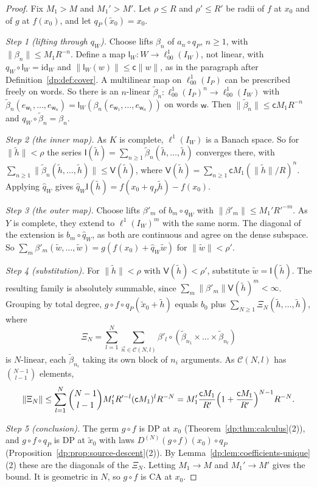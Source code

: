 \documentclass[11pt]{amsart}
\theoremstyle{definition}
\theoremstyle{remark}
\numberwithin{equation}{section}
\newcommand{\id}{\mathrm{id}}
\newcommand{\norm}[1]{\lVert #1\rVert}
\theoremstyle{plain}
\theoremstyle{definition}
\theoremstyle{plain}
\begin{document}
\begin{proof}
Fix $M_1>M$ and $M_1'>M'$. Let $\rho\le R$ and $\rho'\le R'$ be radii of $f$ at $x_0$ and of $g$ at $f(x_0)$, and let $q_P(\tilde x_0)=x_0$.

\emph{Step 1 (lifting through $q_W$).} Choose lifts $\beta_n$ of $a_n\circ q_P$, $n\ge1$, with $\norm{\beta_n}\le M_1R^{-n}$. Define a map $\mathsf l_W\colon W\to\ell^1_{00}(I_W)$, not linear, with $q_W\circ\mathsf l_W=\id_W$ and $\norm{\mathsf l_W(w)}\le\mathsf c\norm w$, as in the paragraph after Definition~\ref{dp:def:cover}. A multilinear map on $\ell^1_{00}(I_P)$ can be prescribed freely on words. So there is an $n$-linear $\tilde\beta_n\colon\ell^1_{00}(I_P)^n\to\ell^1_{00}(I_W)$ with $\tilde\beta_n(e_{\mathsf w_1},\dots,e_{\mathsf w_n})=\mathsf l_W(\beta_n(e_{\mathsf w_1},\dots,e_{\mathsf w_n}))$ on words $\mathsf w$. Then $\norm{\tilde\beta_n}\le\mathsf cM_1R^{-n}$ and $q_W\circ\tilde\beta_n=\beta_n$.

\emph{Step 2 (the inner map).} As $K$ is complete, $\ell^1(I_W)$ is a Banach space. So for $\norm{\tilde h}<\rho$ the series $\mathsf I(\tilde h)=\sum_{n\ge1}\tilde\beta_n(\tilde h,\dots,\tilde h)$ converges there, with $\sum_{n\ge1}\norm{\tilde\beta_n(\tilde h,\dots,\tilde h)}\le\mathsf V(\tilde h)$, where $\mathsf V(\tilde h)=\sum_{n\ge1}\mathsf cM_1(\norm{\tilde h}/R)^n$. Applying $\hat q_W$ gives $\hat q_W\mathsf I(\tilde h)=f(x_0+q_P\tilde h)-f(x_0)$.

\emph{Step 3 (the outer map).} Choose lifts $\beta'_m$ of $b_m\circ q_W$ with $\norm{\beta'_m}\le M_1'R'^{-m}$. As $Y$ is complete, they extend to $\ell^1(I_W)^m$ with the same norm. The diagonal of the extension is $b_m\circ\hat q_W$, as both are continuous and agree on the dense subspace. So $\sum_m\beta'_m(\tilde w,\dots,\tilde w)=g(f(x_0)+\hat q_W\tilde w)$ for $\norm{\tilde w}<\rho'$.

\emph{Step 4 (substitution).} For $\norm{\tilde h}<\rho$ with $\mathsf V(\tilde h)<\rho'$, substitute $\tilde w=\mathsf I(\tilde h)$. The resulting family is absolutely summable, since $\sum_m\norm{\beta'_m}\mathsf V(\tilde h)^m<\infty$. Grouping by total degree, $g\circ f\circ q_P(\tilde x_0+\tilde h)$ equals $b_0$ plus $\sum_{N\ge1}\Xi_N(\tilde h,\dots,\tilde h)$, where
\[
 \Xi_N=\sum_{l=1}^N\sum_{\vec n\in\mathcal C(N,l)}\beta'_l\circ(\tilde\beta_{n_1}\times\dots\times\tilde\beta_{n_l})
\]
is $N$-linear, each $\tilde\beta_{n_i}$ taking its own block of $n_i$ arguments. As $\mathcal C(N,l)$ has $\binom{N-1}{l-1}$ elements,
\[
 \norm{\Xi_N}\le\sum_{l=1}^N\binom{N-1}{l-1}M_1'R'^{-l}(\mathsf cM_1)^lR^{-N}=M_1'\frac{\mathsf cM_1}{R'}\Bigl(1+\frac{\mathsf cM_1}{R'}\Bigr)^{N-1}R^{-N}.
\]

\emph{Step 5 (conclusion).} The germ $g\circ f$ is DP at $x_0$ (Theorem~\ref{dp:thm:calculus}(2)), and $g\circ f\circ q_P$ is DP at $\tilde x_0$ with laws $D^{(N)}(g\circ f)(x_0)\circ q_P$ (Proposition~\ref{dp:prop:source-descent}(2)). By Lemma~\ref{dp:lem:coefficients-unique}(2) these are the diagonals of the $\Xi_N$. Letting $M_1\to M$ and $M_1'\to M'$ gives the bound. It is geometric in $N$, so $g\circ f$ is CA at $x_0$.
\end{proof}
\end{document}
